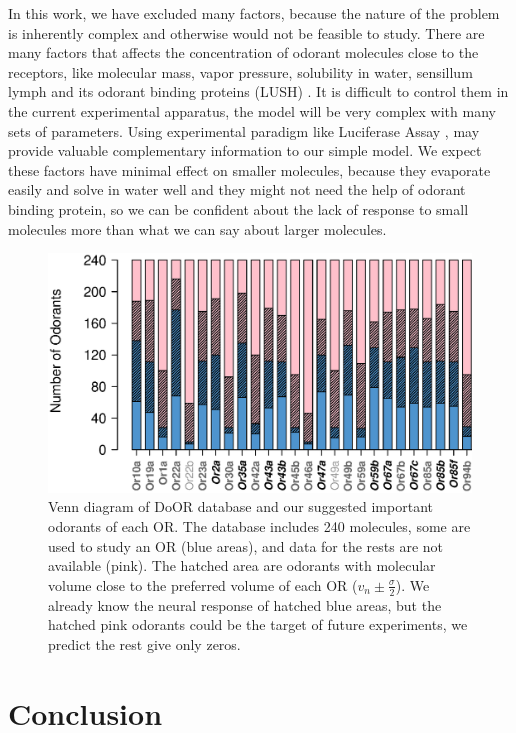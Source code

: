 \documentclass[fleqn,10pt]{wlscirep} %
\begin{document}
In this work, we have excluded many factors, 
because the nature of the problem is inherently complex and otherwise would not be feasible to study. 
There are many factors that affects the concentration of odorant molecules close to the receptors, 
like molecular mass, vapor pressure, solubility in water, sensillum lymph and its odorant binding proteins (LUSH) \cite{xu2005drosophila,gomez2013ligands}. 
It is difficult to control them in the current experimental apparatus, the model will be very complex with many sets of parameters. 
Using experimental paradigm like Luciferase Assay \cite{mainland2015human}, 
may provide valuable complementary information to our simple model.
We expect these factors have minimal effect on smaller molecules, 
because they evaporate easily and solve in water well and they might not need the help of odorant binding protein, 
so we can be confident about the lack of response to small molecules more than what we can say about larger molecules. 

\begin{figure}
\centering
	\includegraphics[width=\textwidth]{odorant-suggest}
	\caption{Venn diagram of DoOR database and our suggested important odorants of each OR.
			The database includes 240 molecules, 
			some are used to study an OR (blue areas), 
			and data for the rests are not available (pink).
			The hatched area are odorants with molecular volume close to the preferred volume of each OR
			($v_n \pm \frac{\sigma}{2}$).
			We already know the neural response of hatched blue areas, 
			but the hatched pink odorants could be the target of future experiments, we predict the rest give only zeros.
			}
	\label{fig:odorant-suggest}
\end{figure}

\section*{Conclusion}
\end{document}
